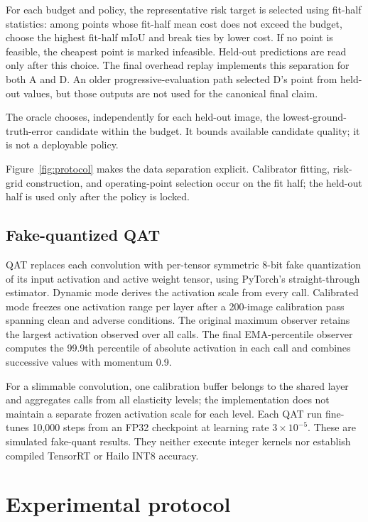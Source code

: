 \documentclass[a4paper,review,12pt]{elsarticle}
\newcommand{\miou}{mIoU}
\begin{document}
For each budget and policy, the representative risk target is selected using fit-half statistics: among points whose fit-half mean cost does not exceed the budget, choose the highest fit-half \miou{} and break ties by lower cost. If no point is feasible, the cheapest point is marked infeasible. Held-out predictions are read only after this choice. The final overhead replay implements this separation for both A and D. An older progressive-evaluation path selected D's point from held-out values, but those outputs are not used for the canonical final claim.

The oracle chooses, independently for each held-out image, the lowest-ground-truth-error candidate within the budget. It bounds available candidate quality; it is not a deployable policy.

Figure~\ref{fig:protocol} makes the data separation explicit. Calibrator fitting, risk-grid construction, and operating-point selection occur on the fit half; the held-out half is used only after the policy is locked.



\subsection{Fake-quantized QAT}
\label{sec:qatmethod}

QAT replaces each convolution with per-tensor symmetric 8-bit fake quantization of its input activation and active weight tensor, using PyTorch's straight-through estimator. Dynamic mode derives the activation scale from every call. Calibrated mode freezes one activation range per layer after a 200-image calibration pass spanning clean and adverse conditions. The original maximum observer retains the largest activation observed over all calls. The final EMA-percentile observer computes the 99.9th percentile of absolute activation in each call and combines successive values with momentum 0.9.

For a slimmable convolution, one calibration buffer belongs to the shared layer and aggregates calls from all elasticity levels; the implementation does not maintain a separate frozen activation scale for each level. Each QAT run fine-tunes 10,000 steps from an FP32 checkpoint at learning rate $3\times10^{-5}$. These are simulated fake-quant results. They neither execute integer kernels nor establish compiled TensorRT or Hailo INT8 accuracy.

\section{Experimental protocol}
\label{sec:protocol}
\end{document}
